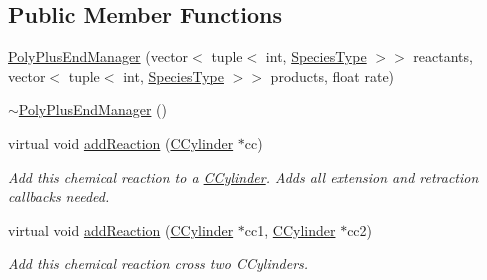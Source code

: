 \subsection*{Public Member Functions}
\begin{DoxyCompactItemize}
\item 
\hyperlink{classPolyPlusEndManager_a1d8112a3c942f81702b2e9d0c580f792}{Poly\+Plus\+End\+Manager} (vector$<$ tuple$<$ int, \hyperlink{Species_8h_a50651af47c56ea0e27235468d23542cf}{Species\+Type} $>$$>$ reactants, vector$<$ tuple$<$ int, \hyperlink{Species_8h_a50651af47c56ea0e27235468d23542cf}{Species\+Type} $>$$>$ products, float rate)
\item 
\hyperlink{classPolyPlusEndManager_a13ea4cecd6e8b72a30b56f996792ca72}{$\sim$\+Poly\+Plus\+End\+Manager} ()
\item 
virtual void \hyperlink{classPolyPlusEndManager_a735f37d5d635849af7ea522798e4384f}{add\+Reaction} (\hyperlink{classCCylinder}{C\+Cylinder} $\ast$cc)
\begin{DoxyCompactList}\small\item\em Add this chemical reaction to a \hyperlink{classCCylinder}{C\+Cylinder}. Adds all extension and retraction callbacks needed. \end{DoxyCompactList}\item 
virtual void \hyperlink{classPolyPlusEndManager_ac5d5bf1e5971c9499d124692267e31b7}{add\+Reaction} (\hyperlink{classCCylinder}{C\+Cylinder} $\ast$cc1, \hyperlink{classCCylinder}{C\+Cylinder} $\ast$cc2)
\begin{DoxyCompactList}\small\item\em Add this chemical reaction cross two C\+Cylinders. \end{DoxyCompactList}\end{DoxyCompactItemize}
